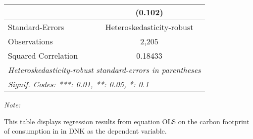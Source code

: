 \begin{table}[htbp!]
\begin{adjustbox}{width = 1\textwidth, max height = 0.95\textheight, center}
\begin{threeparttable}[b]
\begin{tabular}{lc}
                                & (0.102)\\   
            \midrule 
            Standard-Errors     & Heteroskedasticity-robust \\   
            Observations        & 2,205\\  
            Squared Correlation & 0.18433\\  
            \midrule \midrule
            \multicolumn{2}{l}{\emph{Heteroskedasticity-robust standard-errors in parentheses}}\\
            \multicolumn{2}{l}{\emph{Signif. Codes: ***: 0.01, **: 0.05, *: 0.1}}\\
         \end{tabular}
         
         \begin{tablenotes}\item \medskip \textit{Note:}
            \item This table displays regression results from equation OLS on the carbon footprint of consumption in  in DNK as the dependent variable.  
         \end{tablenotes}
      \end{threeparttable}
   \end{adjustbox}
\end{table}


